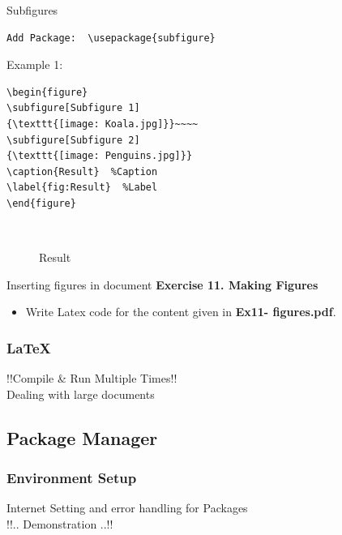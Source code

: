 \documentclass [9pt] {beamer}
\begin{document}
\begin{frame}[fragile]{Subfigures}
\begin{verbatim}
Add Package:  \usepackage{subfigure}
\end{verbatim}
\scriptsize
Example 1:
{\color{blue}
\begin{verbatim}
\begin{figure}
\subfigure[Subfigure 1]
{\texttt{[image: Koala.jpg]}}~~~~
\subfigure[Subfigure 2]
{\texttt{[image: Penguins.jpg]}}
\caption{Result}  %Caption
\label{fig:Result}  %Label
\end{figure}
\end{verbatim}
}

\begin{figure}
~~~~
	\caption{Result}  %
	\label{fig:Result}  %
\end{figure}
\end{frame}

\begin{frame}{Inserting figures in document}
\textbf{Exercise 11. Making Figures}\\[.30cm]
\begin{itemize}
	\item Write Latex code for the content given in \textbf{Ex11- figures.pdf}.
\end{itemize}


\end{frame}

%

\begin{frame}\frametitle{\LaTeX}
\rm
\fontsize{9pt}{11pt}\selectfont
\begin{center}
\Huge \textcolor[rgb]{0.98,0.00,0.00}{!!Compile \& Run Multiple Times!!}\\
Dealing with large documents

\end{center}
\end{frame}

\subsection{Package Manager}
\begin{frame}\frametitle{Environment Setup}
\rm
\fontsize{9pt}{11pt}\selectfont
\begin{center}
\Large Internet Setting and error handling for  \textcolor[rgb]{0.98,0.00,0.00}{Packages}\\[0.4cm]

\LARGE !!.. Demonstration ..!! 

 

\end{center}
\end{frame}
\end{document}
